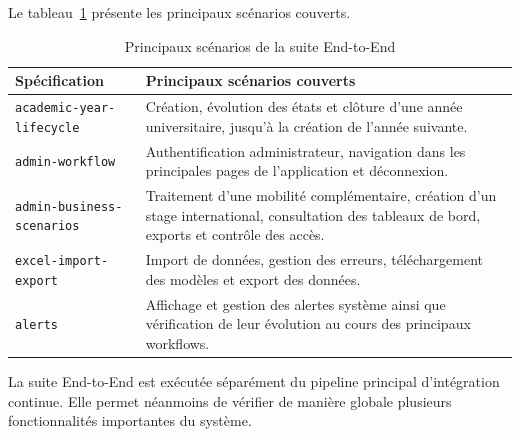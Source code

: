 Le tableau~\ref{tab:e2e-parcours} présente les principaux scénarios couverts.

\renewcommand{\arraystretch}{1.3}

\begin{table}[H]

\centering

\caption{Principaux scénarios de la suite End-to-End}

\label{tab:e2e-parcours}

\footnotesize

\begin{tabular}{|p{5cm}|p{7.6cm}|}

\hline

\rowcolor{gray!20}

\textbf{Spécification} &
\textbf{Principaux scénarios couverts} \\

\hline

\texttt{academic-year-lifecycle} &
Création, évolution des états et clôture d'une année universitaire, jusqu'à la création de l'année suivante. \\

\hline

\texttt{admin-workflow} &
Authentification administrateur, navigation dans les principales pages de l'application et déconnexion. \\

\hline

\texttt{admin-business-scenarios} &
Traitement d'une mobilité complémentaire, création d'un stage international, consultation des tableaux de bord, exports et contrôle des accès. \\

\hline

\texttt{excel-import-export} &
Import de données, gestion des erreurs, téléchargement des modèles et export des données. \\

\hline

\texttt{alerts} &
Affichage et gestion des alertes système ainsi que vérification de leur évolution au cours des principaux workflows. \\

\hline

\end{tabular}

\end{table}

La suite End-to-End est exécutée séparément du pipeline principal d'intégration continue. Elle permet néanmoins de vérifier de manière globale plusieurs fonctionnalités importantes du système.

